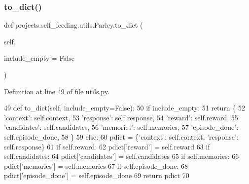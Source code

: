 \subsubsection{\texorpdfstring{to\+\_\+dict()}{to\_dict()}}
{\footnotesize\ttfamily def projects.\+self\+\_\+feeding.\+utils.\+Parley.\+to\+\_\+dict (\begin{DoxyParamCaption}\item[{}]{self,  }\item[{}]{include\+\_\+empty = {\ttfamily False} }\end{DoxyParamCaption})}



Definition at line 49 of file utils.\+py.


\begin{DoxyCode}
49     \textcolor{keyword}{def }to\_dict(self, include\_empty=False):
50         \textcolor{keywordflow}{if} include\_empty:
51             \textcolor{keywordflow}{return} \{
52                 \textcolor{stringliteral}{'context'}: self.context,
53                 \textcolor{stringliteral}{'response'}: self.response,
54                 \textcolor{stringliteral}{'reward'}: self.reward,
55                 \textcolor{stringliteral}{'candidates'}: self.candidates,
56                 \textcolor{stringliteral}{'memories'}: self.memories,
57                 \textcolor{stringliteral}{'episode\_done'}: self.episode\_done,
58             \}
59         \textcolor{keywordflow}{else}:
60             pdict = \{\textcolor{stringliteral}{'context'}: self.context, \textcolor{stringliteral}{'response'}: self.response\}
61             \textcolor{keywordflow}{if} self.reward:
62                 pdict[\textcolor{stringliteral}{'reward'}] = self.reward
63             \textcolor{keywordflow}{if} self.candidates:
64                 pdict[\textcolor{stringliteral}{'candidates'}] = self.candidates
65             \textcolor{keywordflow}{if} self.memories:
66                 pdict[\textcolor{stringliteral}{'memories'}] = self.memories
67             \textcolor{keywordflow}{if} self.episode\_done:
68                 pdict[\textcolor{stringliteral}{'episode\_done'}] = self.episode\_done
69             \textcolor{keywordflow}{return} pdict
70 
\end{DoxyCode}
\mbox{\label{classprojects_1_1self__feeding_1_1utils_1_1Parley_af1eb92a221df6f29ed68b6bb43ae0802}} 
